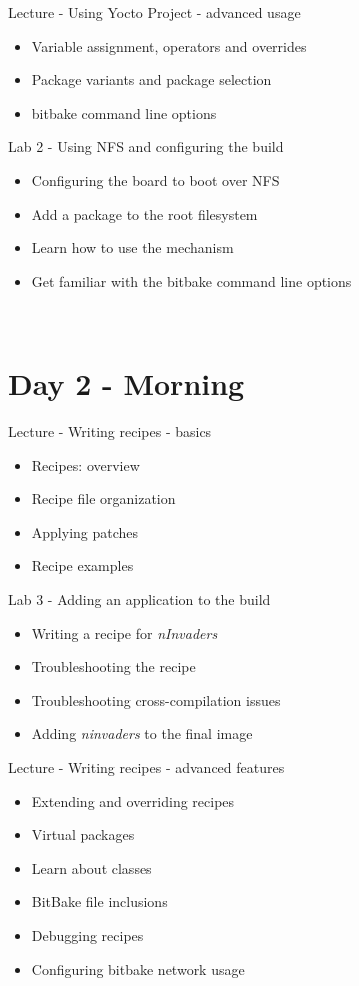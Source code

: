 \documentclass[a4paper,12pt,obeyspaces,spaces,hyphens]{article}
\begin{document}
\feagendatwocolumn
{Lecture - Using Yocto Project - advanced usage}
{
  \begin{itemize}
  \item Variable assignment, operators and overrides
  \item Package variants and package selection
  \item bitbake command line options
  \end{itemize}
}
{Lab 2 - Using NFS and configuring the build}
{
  \begin{itemize}
  \item Configuring the board to boot over NFS
  \item Add a package to the root filesystem
  \item Learn how to use the  mechanism
  \item Get familiar with the bitbake command line options
  \end{itemize}
}
\\
\section{Day 2 - Morning}

\feagendatwocolumn
{Lecture - Writing recipes - basics}
{
  \begin{itemize}
  \item Recipes: overview
  \item Recipe file organization
  \item Applying patches
  \item Recipe examples
  \end{itemize}
}
{Lab 3 - Adding an application to the build}
{
  \begin{itemize}
  \item Writing a recipe for {\em nInvaders}
  \item Troubleshooting the recipe
  \item Troubleshooting cross-compilation issues
  \item Adding {\em ninvaders} to the final image
  \end{itemize}
}

\feagendaonecolumn
{Lecture - Writing recipes - advanced features}
{
  \begin{itemize}
  \item Extending and overriding recipes
  \item Virtual packages
  \item Learn about classes
  \item BitBake file inclusions
  \item Debugging recipes
  \item Configuring bitbake network usage
  \end{itemize}
}
\end{document}
